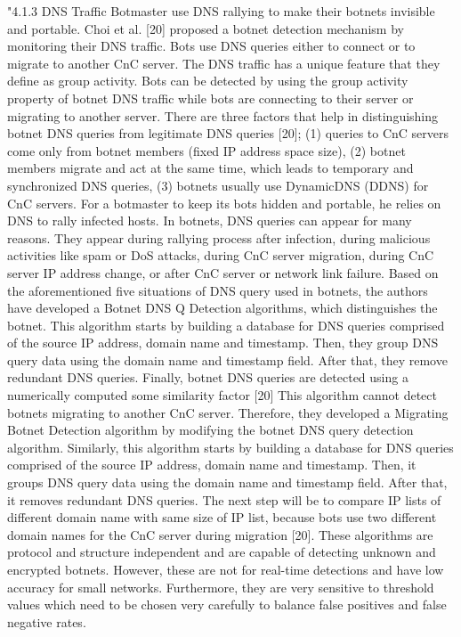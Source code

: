 "4.1.3 DNS Traffic Botmaster use DNS rallying to make their botnets invisible and portable. Choi et al. [20] proposed a botnet detection mechanism by monitoring their DNS traffic. Bots use DNS queries either to connect or to migrate to another CnC server. The DNS traffic has a unique feature that they define as group activity. Bots can be detected by using the group activity property of botnet DNS traffic while bots are connecting to their server or migrating to another server. There are three factors that help in distinguishing botnet DNS queries from legitimate DNS queries [20]; 
(1) queries to CnC servers come only from botnet members (fixed IP address space size), 
(2) botnet members migrate and act at the same time, which leads to temporary and synchronized DNS queries, 
(3) botnets usually use DynamicDNS (DDNS) for CnC servers. 
For a botmaster to keep its bots hidden and portable, he relies on DNS to rally infected hosts. In botnets, DNS queries can appear for many reasons. They appear during rallying process after infection, during malicious activities like spam or DoS attacks, during CnC server migration, during CnC server IP address change, or after CnC server or network link failure. Based on the aforementioned five situations of DNS query used in botnets, the authors have developed a Botnet DNS Q Detection algorithms, which distinguishes the botnet. This algorithm starts by building a database for DNS queries comprised of the source IP address, domain name and timestamp. Then, they group DNS query data using the domain name and timestamp field. After that, they remove redundant DNS queries. Finally, botnet
DNS queries are detected using a numerically computed some similarity factor [20] This algorithm cannot detect botnets migrating to another CnC server. Therefore, they developed a Migrating Botnet Detection algorithm by modifying the botnet DNS query detection algorithm. Similarly, this algorithm starts by building a database for DNS queries comprised of the source IP address, domain name and timestamp. Then, it groups DNS query data using the domain name and timestamp field.
After that, it removes redundant DNS queries. The next step will be to compare IP lists of different domain name with same size of IP list, because bots use two different domain names for the CnC server during migration [20]. These algorithms are protocol and structure independent and are capable of detecting unknown and encrypted botnets. However, these are not for real-time detections and have low accuracy for small networks. Furthermore, they are very sensitive to threshold values which need to be chosen very carefully to balance false positives and false negative rates.


